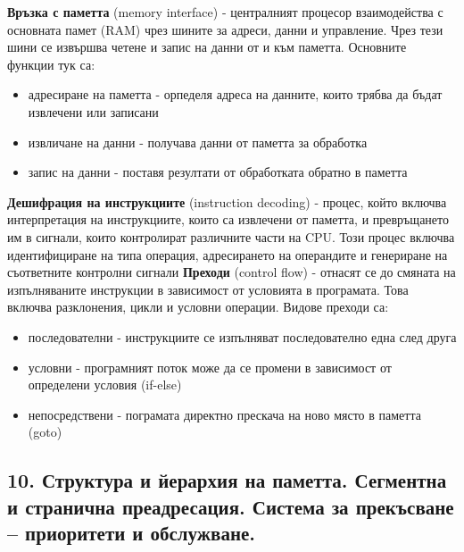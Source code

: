 \documentclass{article}
\begin{document}
\textbf{Връзка с паметта} (memory interface) - централният процесор взаимодейства с основната памет (RAM) чрез шините за адреси, данни и управление. Чрез
тези шини се извършва четене и запис на данни от и към паметта. Основните функции тук са:
\begin{itemize}
    \item адресиране на паметта - орпеделя адреса на данните, които трябва да бъдат извлечени или записани
    \item извличане на данни - получава данни от паметта за обработка
    \item запис на данни - поставя резултати от обработката обратно в паметта
\end{itemize}
\textbf{Дешифрация на инструкциите} (instruction decoding) - процес, който включва интерпретация на инструкциите, които са извлечени от паметта, и превръщането
им в сигнали, които контролират различните части на CPU. Този процес включва идентифициране на типа операция, адресирането на операндите и генериране
на съответните контролни сигнали \newline\newline
\textbf{Преходи} (control flow) - отнасят се до смяната на изпълняваните инструкции в зависимост от условията в програмата. Това включва разклонения, цикли и
условни операции. Видове преходи са:
\begin{itemize}
    \item последователни - инструкциите се изпълняват последователно една след друга
    \item условни - програмният поток може да се промени в зависимост от определени условия (if-else)
    \item непосредствени - пограмата директно прескача на ново място в паметта (goto)
\end{itemize}
\subsection*{\color{bordeaux}10. Структура и йерархия на паметта. Сегментна и странична преадресация. Система за прекъсване – приоритети и обслужване.}
\end{document}
